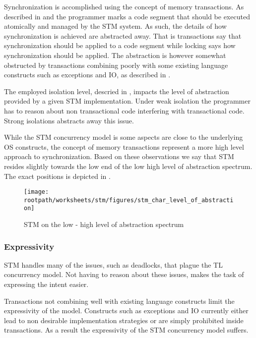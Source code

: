 Synchronization is accomplished using the concept of memory transactions. As described in  and   the programmer marks a code segment that should be executed atomically and managed by the \ac{STM} system. As such, the details of how synchronization is achieved are abstracted away. That is transactions say that synchronization should be applied to a code segment while locking says how synchronization should be applied. The abstraction is however somewhat obstructed by transactions combining poorly with some existing language constructs such as exceptions and \ac{IO}, as described in \bsref{}.

The employed isolation level, descried in , impacts the level of abstraction provided by a given \ac{STM} implementation. Under weak isolation the programmer has to reason about non transactional code interfering with transactional code. Strong isolations abstracts away this issue.

While the \ac{STM} concurrency model is some aspects are close to the underlying \ac{OS} constructs, the concept of memory transactions represent a more high level approach to synchronization. Based on these observations we say that \ac{STM} resides slightly towards the low end of the low high level of abstraction spectrum. The exact positions is depicted in .

\begin{figure}[htbp]
\centering
 \texttt{[image: \\rootpath/worksheets/stm/figures/stm\_char\_level\_of\_abstraction]} 
 \caption{\ac{STM} on the low - high level of abstraction spectrum}
\label{fig:char_stm_level_of_abstraction}
\end{figure}

\subsubsection{Expressivity}\label{sec:stm_expressivity}

\ac{STM} handles many of the issues, such as deadlocks, that plague the \ac{TL} concurrency model. Not having to reason about these issues, makes the task of expressing the intent easier. 

Transactions not combining well with existing language constructs limit the expressivity of the model. Constructs such as exceptions and \ac{IO} currently either lead to non desirable implementation strategies or are simply prohibited inside transactions. As a result the expressivity of the \ac{STM} concurrency model suffers.

